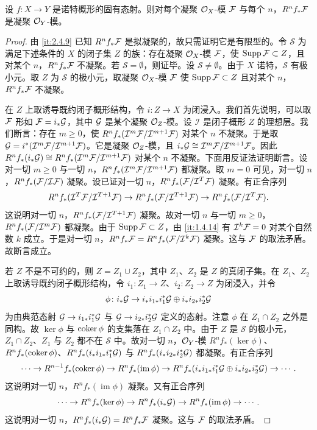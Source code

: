 \begin{theorem}\label{it:2.5.1}
设 $f\colon X\to Y$ 是诺特概形的固有态射。则对每个凝聚 $\mathcal{O}_X$-模 $\mathcal{F}$ 与每个 $n$，$R^nf_*\mathcal{F}$ 是凝聚 $\mathcal{O}_Y$-模。
\end{theorem}
\begin{proof}
由 \ref{it:2.4.9} 已知 $R^nf_*\mathcal{F}$ 是拟凝聚的，故只需证明它是有限型的。令 $\mathcal{S}$ 为满足下述条件的 $X$ 的闭子集 $Z$ 的族：存在凝聚 $\mathcal{O}_X$-模 $\mathcal{F}$，使 $\operatorname{Supp}\mathcal{F}\subset Z$，且对某个 $n$，$R^nf_*\mathcal{F}$ 不凝聚。若 $\mathcal{S}=\emptyset$，则证毕。设 $\mathcal{S}\neq\emptyset$。由于 $X$ 诺特，$\mathcal{S}$ 有极小元。取 $Z$ 为 $\mathcal{S}$ 的极小元，取凝聚 $\mathcal{O}_X$-模 $\mathcal{F}$ 使 $\operatorname{Supp}\mathcal{F}\subset Z$ 且对某个 $n$，$R^nf_*\mathcal{F}$ 不凝聚。

在 $Z$ 上取诱导既约闭子概形结构，令 $i\colon Z\to X$ 为闭浸入。我们首先说明，可以取 $\mathcal{F}$ 形如 $\mathcal{F}=i_*\mathcal{G}$，其中 $\mathcal{G}$ 是某个凝聚 $\mathcal{O}_Z$-模。设 $\mathcal{I}$ 是闭子概形 $Z$ 的理想层。我们断言：存在 $m\ge 0$，使 $R^nf_*(\mathcal{I}^m\mathcal{F}/\mathcal{I}^{m+1}\mathcal{F})$ 对某个 $n$ 不凝聚。于是取 $\mathcal{G}=i^*(\mathcal{I}^m\mathcal{F}/\mathcal{I}^{m+1}\mathcal{F})$。它是凝聚 $\mathcal{O}_Z$-模，且 $i_*\mathcal{G}\cong\mathcal{I}^m\mathcal{F}/\mathcal{I}^{m+1}\mathcal{F}$。因此 $R^nf_*(i_*\mathcal{G})\cong R^nf_*(\mathcal{I}^m\mathcal{F}/\mathcal{I}^{m+1}\mathcal{F})$ 对某个 $n$ 不凝聚。下面用反证法证明断言。设对一切 $m\ge 0$ 与一切 $n$，$R^nf_*(\mathcal{I}^m\mathcal{F}/\mathcal{I}^{m+1}\mathcal{F})$ 都凝聚。取 $m=0$ 可见，对一切 $n$，$R^nf_*(\mathcal{F}/\mathcal{I}\mathcal{F})$ 凝聚。设已证对一切 $n$，$R^nf_*(\mathcal{F}/\mathcal{I}^T\mathcal{F})$ 凝聚。有正合序列
\[
R^nf_*(\mathcal{I}^T\mathcal{F}/\mathcal{I}^{T+1}\mathcal{F})\to R^nf_*(\mathcal{F}/\mathcal{I}^{T+1}\mathcal{F})\to R^nf_*(\mathcal{F}/\mathcal{I}^T\mathcal{F}).
\]
这说明对一切 $n$，$R^nf_*(\mathcal{F}/\mathcal{I}^{T+1}\mathcal{F})$ 凝聚。故对一切 $n$ 与一切 $m\ge 0$，$R^nf_*(\mathcal{F}/\mathcal{I}^m\mathcal{F})$ 都凝聚。由于 $\operatorname{Supp}\mathcal{F}\subset Z$，由 \ref{it:1.4.14} 有 $\mathcal{I}^k\mathcal{F}=0$ 对某个自然数 $k$ 成立。于是对一切 $n$，$R^nf_*\mathcal{F}=R^nf_*(\mathcal{F}/\mathcal{I}^k\mathcal{F})$ 凝聚。这与 $\mathcal{F}$ 的取法矛盾。故断言成立。

若 $Z$ 不是不可约的，则 $Z=Z_1\cup Z_2$，其中 $Z_1$、$Z_2$ 是 $Z$ 的真闭子集。在 $Z_1$、$Z_2$ 上取诱导既约闭子概形结构，令 $i_1\colon Z_1\to Z$、$i_2\colon Z_2\to Z$ 为闭浸入，并令
\[
\phi\colon i_*\mathcal{G}\to i_*i_{1*}i_1^*\mathcal{G}\oplus i_*i_{2*}i_2^*\mathcal{G}
\]
为由典范态射 $\mathcal{G}\to i_{1*}i_1^*\mathcal{G}$ 与 $\mathcal{G}\to i_{2*}i_2^*\mathcal{G}$ 定义的态射。注意 $\phi$ 在 $Z_1\cap Z_2$ 之外是同构。故 $\ker\phi$ 与 $\operatorname{coker}\phi$ 的支集落在 $Z_1\cap Z_2$ 中。由于 $Z$ 是 $\mathcal{S}$ 的极小元，$Z_1\cap Z_2$、$Z_1$ 与 $Z_2$ 都不在 $\mathcal{S}$ 中。故对一切 $n$，$\mathcal{O}_Y$-模 $R^nf_*(\ker\phi)$、$R^nf_*(\operatorname{coker}\phi)$、$R^nf_*(i_*i_{1*}i_1^*\mathcal{G})$ 与 $R^nf_*(i_*i_{2*}i_2^*\mathcal{G})$ 都凝聚。有正合序列
\[
\cdots\to R^{n-1}f_*(\operatorname{coker}\phi)\to R^nf_*(\operatorname{im}\phi)\to R^nf_*(i_*i_{1*}i_1^*\mathcal{G}\oplus i_*i_{2*}i_2^*\mathcal{G})\to\cdots.
\]
这说明对一切 $n$，$R^nf_*(\operatorname{im}\phi)$ 凝聚。又有正合序列
\[
\cdots\to R^nf_*(\ker\phi)\to R^nf_*(i_*\mathcal{G})\to R^nf_*(\operatorname{im}\phi)\to\cdots.
\]
这说明对一切 $n$，$R^nf_*(i_*\mathcal{G})=R^nf_*\mathcal{F}$ 凝聚。这与 $\mathcal{F}$ 的取法矛盾。


\end{proof}
